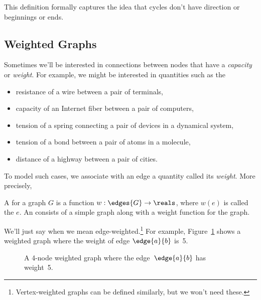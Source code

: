 This definition formally captures the idea that cycles don't
have direction or beginnings or ends.

\iffalse

\begin{editingnotes}
\section{Weighted Graphs}

Sometimes we'll be interested in connections between nodes that have a
\emph{capacity} or \emph{weight}.  For example, we might be interested in
quantities such as the
\begin{itemize}

\item resistance of a wire between a pair of terminals, 

\item capacity of an Internet fiber between a pair of computers,

\item tension of a spring connecting a pair of devices in a dynamical system,

\item tension of a bond between a pair of atoms in a molecule,

\item distance of a highway between a pair of cities.

\end{itemize}
To model such cases, we associate with an edge a quantity called its
\emph{weight}.  More precisely,
\begin{definition}
  A  for a graph $G$ is a function $w: \edges{G} \to
  \reals$, where $w(e)$ is called the  $e$.
An  consists of a simple graph along with
a weight function for the graph.
\end{definition}
We'll just say  when we mean
edge-weighted.\footnote{Vertex-weighted graphs can be defined similarly,
  but we won't need these.}
For example, Figure~\ref{fig:weighted_graph} shows a weighted graph
where the weight of edge $\edge{a}{b}$ is~5.

\begin{figure}


\caption{A 4-node weighted graph where the edge~$\edge{a}{b}$ has
  weight~5.}
\label{fig:weighted_graph}
\end{figure}


\end{editingnotes}
